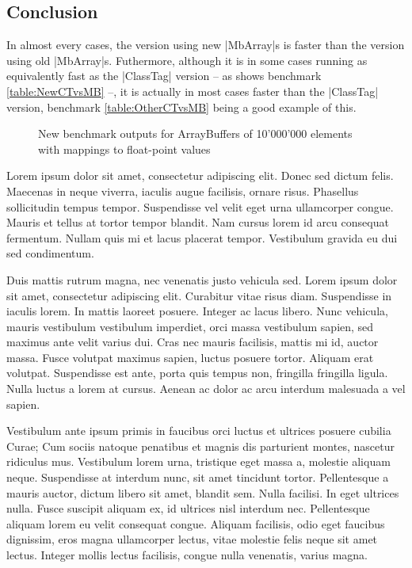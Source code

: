 \subsection{Conclusion}

In almost every cases, the version using new |MbArray|s is faster than the version using old |MbArray|s. Futhermore, although it is in some cases running as equivalently fast as the |ClassTag| version -- as shows benchmark \ref{table:NewCTvsMB} --, it is actually in most cases faster than the |ClassTag| version, benchmark \ref{table:OtherCTvsMB} being a good example of this. 



\begin{figure}
\caption{New benchmark outputs for ArrayBuffers of 10'000'000 elements with mappings to float-point values}
\label{fig:OtherGcComp}
\end{figure}

Lorem ipsum dolor sit amet, consectetur adipiscing elit. Donec sed dictum felis. Maecenas in neque viverra, iaculis augue facilisis, ornare risus. Phasellus sollicitudin tempus tempor. Suspendisse vel velit eget urna ullamcorper congue. Mauris et tellus at tortor tempor blandit. Nam cursus lorem id arcu consequat fermentum. Nullam quis mi et lacus placerat tempor. Vestibulum gravida eu dui sed condimentum.

Duis mattis rutrum magna, nec venenatis justo vehicula sed. Lorem ipsum dolor sit amet, consectetur adipiscing elit. Curabitur vitae risus diam. Suspendisse in iaculis lorem. In mattis laoreet posuere. Integer ac lacus libero. Nunc vehicula, mauris vestibulum vestibulum imperdiet, orci massa vestibulum sapien, sed maximus ante velit varius dui. Cras nec mauris facilisis, mattis mi id, auctor massa. Fusce volutpat maximus sapien, luctus posuere tortor. Aliquam erat volutpat. Suspendisse est ante, porta quis tempus non, fringilla fringilla ligula. Nulla luctus a lorem at cursus. Aenean ac dolor ac arcu interdum malesuada a vel sapien.

Vestibulum ante ipsum primis in faucibus orci luctus et ultrices posuere cubilia Curae; Cum sociis natoque penatibus et magnis dis parturient montes, nascetur ridiculus mus. Vestibulum lorem urna, tristique eget massa a, molestie aliquam neque. Suspendisse at interdum nunc, sit amet tincidunt tortor. Pellentesque a mauris auctor, dictum libero sit amet, blandit sem. Nulla facilisi. In eget ultrices nulla. Fusce suscipit aliquam ex, id ultrices nisl interdum nec. Pellentesque aliquam lorem eu velit consequat congue. Aliquam facilisis, odio eget faucibus dignissim, eros magna ullamcorper lectus, vitae molestie felis neque sit amet lectus. Integer mollis lectus facilisis, congue nulla venenatis, varius magna.

